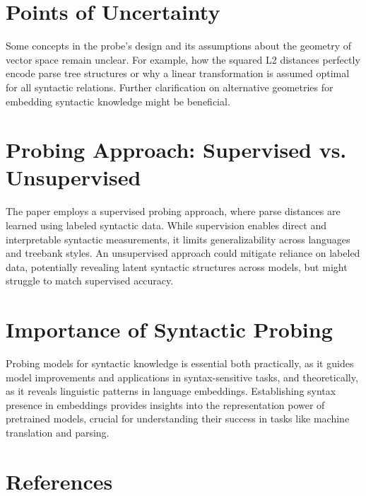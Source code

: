 \documentclass[11pt]{article}
\begin{document}
\section*{Points of Uncertainty}
Some concepts in the probe's design and its assumptions about the geometry of vector space remain unclear. For example, how the squared L2 distances perfectly encode parse tree structures or why a linear transformation is assumed optimal for all syntactic relations. Further clarification on alternative geometries for embedding syntactic knowledge might be beneficial.

\section*{Probing Approach: Supervised vs. Unsupervised}
The paper employs a supervised probing approach, where parse distances are learned using labeled syntactic data. While supervision enables direct and interpretable syntactic measurements, it limits generalizability across languages and treebank styles. An unsupervised approach could mitigate reliance on labeled data, potentially revealing latent syntactic structures across models, but might struggle to match supervised accuracy.

\section*{Importance of Syntactic Probing}
Probing models for syntactic knowledge is essential both practically, as it guides model improvements and applications in syntax-sensitive tasks, and theoretically, as it reveals linguistic patterns in language embeddings. Establishing syntax presence in embeddings provides insights into the representation power of pretrained models, crucial for understanding their success in tasks like machine translation and parsing.

\section*{References}
\end{document}
